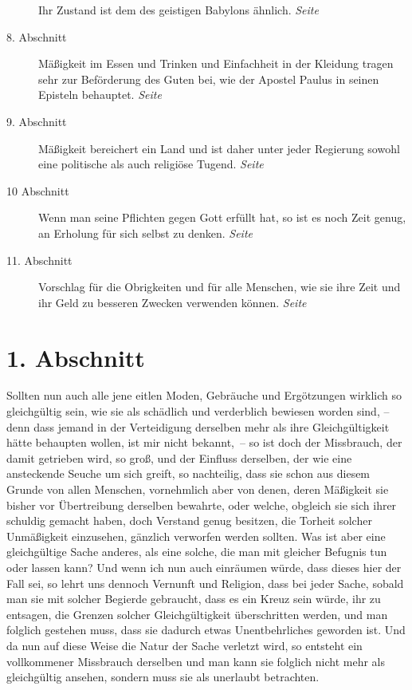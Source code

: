 \begin{description}
Ihr Zustand ist dem des geistigen Babylons ähnlich.
\dotfill \textit{Seite~\pageref{kap18_ab7}}\\
\item[8. Abschnitt] Mäßigkeit im Essen und Trinken und Einfachheit in der
Kleidung tragen sehr zur Beförderung des Guten bei, wie der Apostel Paulus in
seinen Episteln behauptet.
\dotfill \textit{Seite~\pageref{kap18_ab8}}\\
\item[9. Abschnitt] Mäßigkeit bereichert ein Land und ist daher unter jeder
Regierung sowohl eine politische als auch religiöse Tugend.
\dotfill \textit{Seite~\pageref{kap18_ab9}}\\
\item[10 Abschnitt] Wenn man seine Pflichten gegen Gott erfüllt hat, so ist es
noch Zeit genug, an Erholung für sich selbst zu denken.
\dotfill \textit{Seite~\pageref{kap18_ab10}}\\
\item[11. Abschnitt] Vorschlag für die Obrigkeiten und für alle Menschen, wie
sie ihre Zeit und ihr Geld zu besseren Zwecken verwenden können.
\dotfill \textit{Seite~\pageref{kap18_ab11}}\\

\end{description}

\newpage

\section{1. Abschnitt} \label{kap18_ab1}

Sollten nun auch alle jene eitlen Moden, Gebräuche und Ergötzungen wirklich so
gleichgültig sein, wie sie als schädlich und verderblich bewiesen worden sind,
-- denn dass jemand in der Verteidigung derselben mehr als ihre Gleichgültigkeit
hätte behaupten wollen, ist mir nicht bekannt,~-- so ist doch der Missbrauch,
der
damit getrieben wird, so groß, und der Einfluss derselben, der wie eine
ansteckende Seuche um sich greift, so nachteilig, dass sie schon aus diesem
Grunde von allen Menschen, vornehmlich aber von denen, deren Mäßigkeit sie
bisher vor Übertreibung derselben bewahrte, oder welche, obgleich sie sich
ihrer schuldig gemacht haben, doch Verstand genug besitzen, die Torheit solcher
Unmäßigkeit einzusehen, gänzlich verworfen werden sollten. Was ist aber eine
gleichgültige Sache anderes, als eine solche, die man mit gleicher Befugnis tun
oder lassen kann? Und wenn ich nun auch einräumen würde, dass dieses hier der
Fall sei, so lehrt uns dennoch Vernunft und Religion, dass bei jeder Sache,
sobald man sie mit solcher Begierde gebraucht, dass es ein Kreuz
sein würde, ihr
zu entsagen, die Grenzen solcher Gleichgültigkeit überschritten werden, und man
folglich gestehen muss, dass sie dadurch etwas Unentbehrliches geworden ist. Und
da nun auf diese Weise die Natur der Sache verletzt wird, so entsteht ein
vollkommener Missbrauch derselben und man kann sie folglich nicht mehr als
gleichgültig ansehen, sondern muss sie als unerlaubt betrachten.

